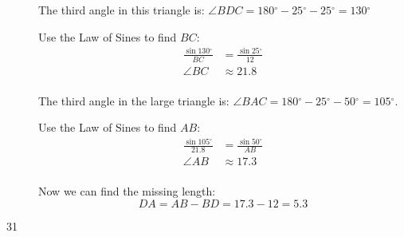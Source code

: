 \documentclass{exam}
\newcommand{\dg}{\ensuremath{^\circ}}
\begin{document}
\begin{description}
        The third angle in this triangle is: $\angle BDC = 180 \dg - 25 \dg - 25 \dg = 130 \dg$

        Use the Law of Sines to find $BC$:
        \begin{align*}
          \frac{\sin 130 \dg}{BC} & = \frac{\sin 25 \dg}{12} \\
          \angle BC               & \approx 21.8 \\
        \end{align*}

        The third angle in the large triangle is: $\angle BAC = 180 \dg - 25 \dg - 50 \dg = 105 \dg$. 
        
        Use the Law of Sines to find $AB$:
        \begin{align*}
          \frac{\sin 105 \dg}{21.8} & = \frac{\sin 50 \dg}{AB} \\
          \angle AB                 & \approx 17.3 \\
        \end{align*}

        Now we can find the missing length:
        \[
          DA = AB - BD = 17.3 - 12 = \boxed{ 5.3 }
        \]

      \item[31] 


\end{description}
\end{document}
